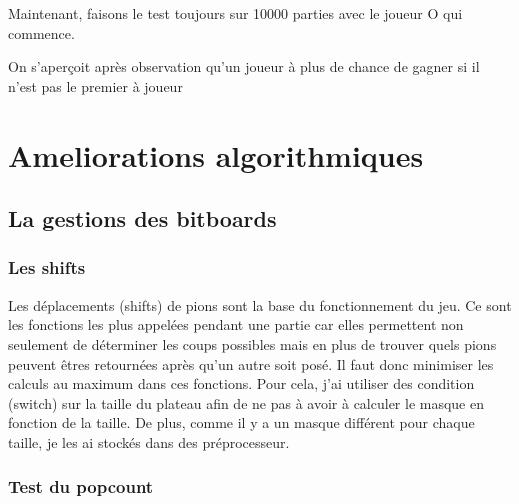 \documentclass{report}
\begin{document}
Maintenant, faisons le test toujours sur 10000 parties avec le joueur O qui commence.\newline

\begin{center}
\end{center}

On s'aperçoit après observation qu'un joueur à plus de chance de gagner si il n'est pas le premier à joueur

\chapter{Ameliorations algorithmiques}
\section{La gestions des bitboards}
\subsection{Les shifts}
Les déplacements (shifts) de pions sont la base du fonctionnement du jeu. Ce sont les fonctions les plus appelées pendant une partie car elles permettent non seulement de déterminer les coups possibles mais en plus de trouver quels pions peuvent êtres retournées après qu'un autre soit posé.
Il faut donc minimiser les calculs au maximum dans ces fonctions.
Pour cela, j'ai utiliser des condition (switch) sur la taille du plateau afin de ne pas à avoir à calculer le masque en fonction de la taille. De plus, comme il y a un masque différent pour chaque taille, je les ai stockés dans des préprocesseur.

\subsection{Test du popcount}
\end{document}

